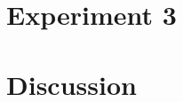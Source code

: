 \documentclass[11pt]{beamer}
\begin{document}






\section{Experiment 3}






%

%


%

\section{Discussion}



%

%




\end{document}
